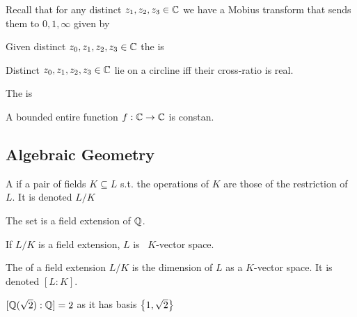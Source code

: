 \documentclass{article}
\begin{document}
Recall that for any distinct $z_1, z_2, z_3 \in \mathbb{C}$ we have a Mobius transform that sends them to $0,1,\infty$ given by 
\begin{definition}
Given distinct $z_0, z_1, z_2, z_3 \in \mathbb{C}$ the  is 
\end{definition}

\begin{prop}
Distinct $z_0, z_1, z_2, z_3 \in \mathbb{C}$ lie on a circline iff their cross-ratio is real. 
\end{prop}

\begin{definition}
	The  is 
\end{definition}

\begin{theorem}[Liouville]
	A bounded entire function $f:\mathbb{C} \to \mathbb{C}$ is constan. 
\end{theorem}

\subsection{Algebraic Geometry}

\begin{definition}
	A  if a pair of fields $K \subseteq L$ s.t. the operations of $K$ are those of the restriction of $L$. It is denoted $L / K$
\end{definition}

\begin{example}
	The set 
is a field extension of $\mathbb{Q}$. 
\end{example}

\begin{prop}
	If $L/K$ is a field extension, $L$ is \ $K$-vector space. 
\end{prop}

\begin{definition}
	The  of a field extension $L/K$ is the dimension of $L$ as a $K$-vector space. It is denoted $[L:K]$.
\end{definition}

\begin{example}
	$[\mathbb{Q}(\sqrt{2}):\mathbb{Q}] = 2$ as it has basis $\left\{ 1,\sqrt{2} \right\}$
\end{example}
\end{document}
